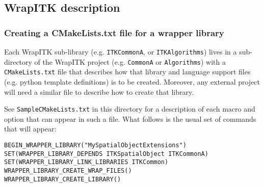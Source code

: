 \documentclass{InsightArticle}
\begin{document}
  \subsection{WrapITK description}

     \subsubsection{Creating a CMakeLists.txt file for a wrapper library}
Each WrapITK sub-library (e.g. \verb$ITKCommonA$, or \verb$ITKAlgorithms$) lives in a
sub-directory of the WrapITK project (e.g. \verb$CommonA$ or \verb$Algorithms$) with a
\verb$CMakeLists.txt$ file that describes how that library  and language support files
(e.g. python template definitions) is to be created. Moreover, any external
project will need a similar file to describe how to create that library.

See \verb$SampleCMakeLists.txt$ in this directory for a description of each macro and
option that can appear in such a file. What follows is the usual set of commands
that will appear:

\small \begin{verbatim}
BEGIN_WRAPPER_LIBRARY("MySpatialObjectExtensions")
SET(WRAPPER_LIBRARY_DEPENDS ITKSpatialObject ITKCommonA)
SET(WRAPPER_LIBRARY_LINK_LIBRARIES ITKCommon)
WRAPPER_LIBRARY_CREATE_WRAP_FILES()
WRAPPER_LIBRARY_CREATE_LIBRARY()
\end{verbatim} \normalsize
\end{document}
